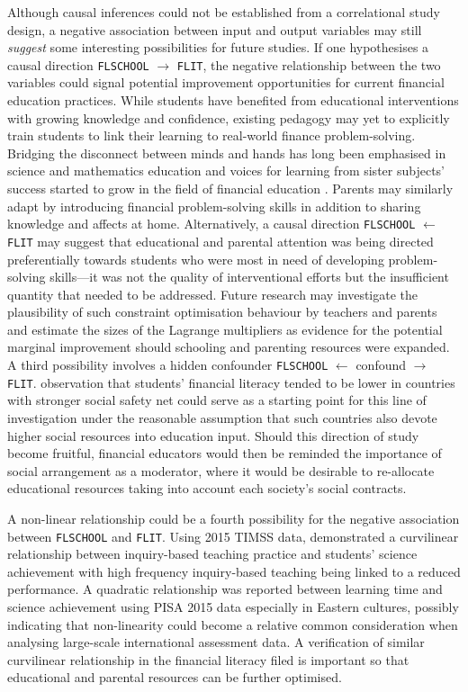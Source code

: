 \documentclass[a4paper,11pt,UKenglish,twoside,openright]{report}\usepackage[]{graphicx}\usepackage[]{color}
\begin{document}
Although causal inferences could not be established from a correlational study design, a negative association between input and output variables may still \emph{suggest} some interesting possibilities for future studies. If one hypothesises a causal direction \texttt{FLSCHOOL} $\longrightarrow$ \texttt{FLIT}, the negative relationship between the two variables could signal potential improvement opportunities for current financial education practices. While students have benefited from educational interventions with growing knowledge and confidence, existing pedagogy may yet to explicitly train students to link their learning to real-world finance problem-solving. Bridging the disconnect between minds and hands has long been emphasised in science \parencite{harlen:1999} and mathematics \parencite{smith:1996} education and voices for learning from sister subjects' success started to grow in the field of financial education \parencite{marleypayne:2021}. Parents may similarly adapt by introducing financial problem-solving skills in addition to sharing knowledge and affects at home. Alternatively, a causal direction \texttt{FLSCHOOL} $\longleftarrow$ \texttt{FLIT} may suggest that educational and parental attention was being directed preferentially towards students who were most in need of developing problem-solving skills---it was not the quality of interventional efforts but the insufficient quantity that needed to be addressed. Future research may investigate the plausibility of such constraint optimisation behaviour by teachers and parents and estimate the sizes of the Lagrange multipliers as evidence for the potential marginal improvement should schooling and parenting resources were expanded. A third possibility involves a hidden confounder \texttt{FLSCHOOL} $\longleftarrow$ confound $\longrightarrow$ \texttt{FLIT}.  observation that students' financial literacy tended to be lower in countries with stronger social safety net could serve as a starting point for this line of investigation under the reasonable assumption that such countries also devote higher social resources into education input. Should this direction of study become fruitful, financial educators would then be reminded the importance of social arrangement as a moderator, where it would be desirable to re-allocate educational resources taking into account each society's social contracts.

A non-linear relationship could be a fourth possibility for the negative association between \texttt{FLSCHOOL} and \texttt{FLIT}. Using 2015 TIMSS data, \textcite{teig:2018} demonstrated a curvilinear relationship between inquiry-based teaching practice and students' science achievement with high frequency inquiry-based teaching being linked to a reduced performance. A quadratic relationship was reported between learning time and science achievement using PISA 2015 data \parencite{zhang:2021} especially in Eastern cultures, possibly indicating that non-linearity could become a relative common consideration when analysing large-scale international assessment data. A verification of similar curvilinear relationship in the financial literacy filed is important so that educational and parental resources can be further optimised.
\end{document}
